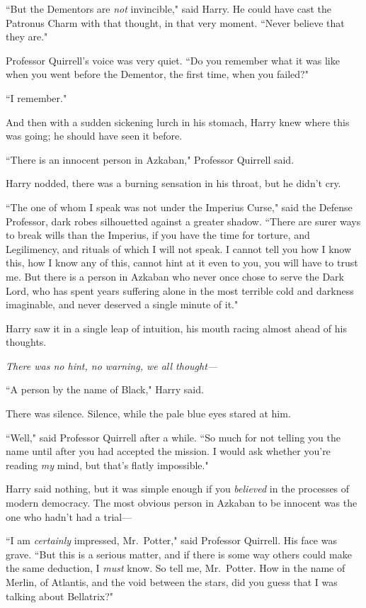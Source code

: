 ``But the Dementors are \emph{not} invincible," said Harry. He could have cast the Patronus Charm with that thought, in that very moment. ``Never believe that they are."

Professor Quirrell's voice was very quiet. ``Do you remember what it was like when you went before the Dementor, the first time, when you failed?"

``I remember."

And then with a sudden sickening lurch in his stomach, Harry knew where this was going; he should have seen it before.

``There is an innocent person in Azkaban," Professor Quirrell said.

Harry nodded, there was a burning sensation in his throat, but he didn't cry.

``The one of whom I speak was not under the Imperius Curse," said the Defense Professor, dark robes silhouetted against a greater shadow. ``There are surer ways to break wills than the Imperius, if you have the time for torture, and Legilimency, and rituals of which I will not speak. I cannot tell you how I know this, how I know any of this, cannot hint at it even to you, you will have to trust me. But there is a person in Azkaban who never once chose to serve the Dark Lord, who has spent years suffering alone in the most terrible cold and darkness imaginable, and never deserved a single minute of it."

Harry saw it in a single leap of intuition, his mouth racing almost ahead of his thoughts.

\emph{There was no hint, no warning, we all thought—}

``A person by the name of Black," Harry said.

There was silence. Silence, while the pale blue eyes stared at him.

``Well," said Professor Quirrell after a while. ``So much for not telling you the name until after you had accepted the mission. I would ask whether you're reading \emph{my} mind, but that's flatly impossible."

Harry said nothing, but it was simple enough if you \emph{believed} in the processes of modern democracy. The most obvious person in Azkaban to be innocent was the one who hadn't had a trial—

``I am \emph{certainly} impressed, Mr.~Potter," said Professor Quirrell. His face was grave. ``But this is a serious matter, and if there is some way others could make the same deduction, I \emph{must} know. So tell me, Mr.~Potter. How in the name of Merlin, of Atlantis, and the void between the stars, did you guess that I was talking about Bellatrix?"

